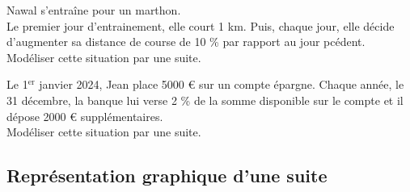 \documentclass[a4paper,11pt,exos]{nsi} %
\begin{document}
\exo{}
Nawal s'entraîne pour un marthon.\\
Le premier jour d'entrainement, elle court 1 km. Puis, chaque jour, elle décide d'augmenter sa distance de course de 10 \% par rapport au jour pcédent.\\[.5em]
Modéliser cette situation par une suite.


\exo{}
Le 1$^{\text{er}}$ janvier 2024, Jean place 5000 € sur un compte épargne. Chaque année, le 31 décembre, la banque lui verse 2 \% de la somme disponible sur le compte et il dépose 2000 € supplémentaires.\\[.5em]
Modéliser cette situation par une suite. 

\newpage
\subsection*{Représentation graphique d'une suite}
\end{document}
